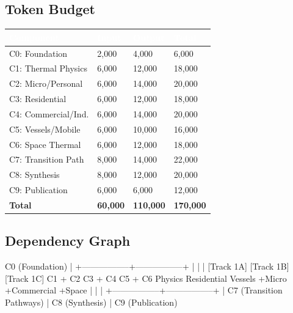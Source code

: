 \documentclass[11pt,letterpaper]{article}
\newcommand{\tableheader}[1]{\textbf{\sffamily\textcolor{white}{#1}}}
\begin{document}
\subsection{Token Budget}

\begin{center}
\begin{tabularx}{\textwidth}{L{4cm}C{2cm}C{2cm}C{2cm}}
\toprule
{}
\tableheader{Component} & \tableheader{Input} & \tableheader{Output} & \tableheader{Total} \\
\midrule
C0: Foundation & 2,000 & 4,000 & 6,000 \\
C1: Thermal Physics & 6,000 & 12,000 & 18,000 \\
C2: Micro/Personal & 6,000 & 14,000 & 20,000 \\
C3: Residential & 6,000 & 12,000 & 18,000 \\
C4: Commercial/Ind. & 6,000 & 14,000 & 20,000 \\
C5: Vessels/Mobile & 6,000 & 10,000 & 16,000 \\
C6: Space Thermal & 6,000 & 12,000 & 18,000 \\
C7: Transition Path & 8,000 & 14,000 & 22,000 \\
C8: Synthesis & 8,000 & 12,000 & 20,000 \\
C9: Publication & 6,000 & 6,000 & 12,000 \\
\midrule
\textbf{Total} & \textbf{60,000} & \textbf{110,000} & \textbf{170,000} \\
\bottomrule
\end{tabularx}
\end{center}

\subsection{Dependency Graph}

\begin{asciibox}
                         C0 (Foundation)
                              |
            +-----------------+-----------------+
            |                 |                 |
      [Track 1A]        [Track 1B]        [Track 1C]
       C1 + C2            C3 + C4           C5 + C6
       Physics            Residential       Vessels
       +Micro             +Commercial       +Space
            |                 |                 |
            +-----------------+-----------------+
                              |
                    C7 (Transition Pathways)
                              |
                    C8 (Synthesis)
                              |
                    C9 (Publication)
\end{asciibox}
\end{document}
